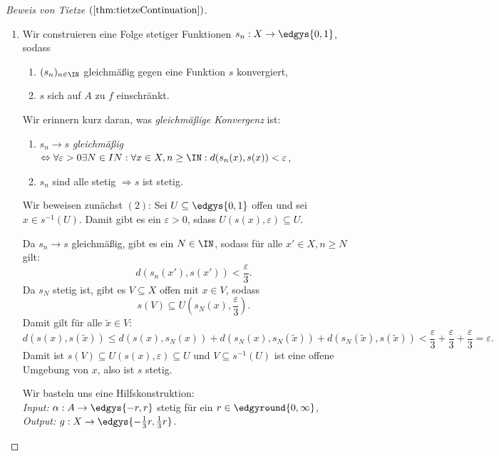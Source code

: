 \documentclass[language=ngerman]{TemplateLecture} %
\begin{document}
\begin{proof}[Beweis von Tietze $(\ref{thm:tietzeContinuation})$]\leavevmode
    \begin{enumerate}[$(i)$]
        \item Wir construieren eine Folge stetiger Funktionen $s_n: X \to \edgys{0,1}$, sodass
        \begin{enumerate}[$(a)$]
            \item $(s_n)_{n \in \IN}$ gleichmäßig gegen eine Funktion $s$ konvergiert,
            \item $s$ sich auf $A$ zu $f$ einschränkt.
        \end{enumerate}
        Wir erinnern kurz daran, was \emph{gleichmäßige Konvergenz} ist:
        \begin{enumerate}[$(1)$]
            \item $s_n \to s$ \emph{gleichmäßig} $\Leftrightarrow \forall \varepsilon>0 \exists N \in IN: \forall x \in X, n \geq \IN: d(s_n(x), s(x)) < \varepsilon$,
            \item $s_n$ sind alle stetig $\Rightarrow s$ ist stetig.
        \end{enumerate}
        Wir beweisen zunächst $(2)$: Sei $U \subseteq \edgys{0,1}$ offen und sei $x \in s^{-1}(U)$. Damit gibt es ein $\varepsilon > 0$, sdass $U(s(x), \varepsilon) \subseteq U$.

        Da $s_n \to s$ gleichmäßig, gibt es ein $N \in \IN$, sodass für alle $x' \in X, n \geq N$ gilt:
        \begin{equation*}
            d(s_n(x'), s(x')) < \frac{\varepsilon}{3}.
        \end{equation*}
        Da $s_N$ stetig ist, gibt es $V \subseteq X$ offen mit $x \in V$, sodass 
        \begin{equation*}
            s(V) \subseteq U\left(s_N(x), \frac{\varepsilon}{3}\right).
        \end{equation*}
        Damit gilt für alle $\tilde{x} \in V$:
        \begin{equation*}
            d(s(x), s(\tilde{x})) \leq d(s(x), s_N(x)) + d(s_N(x), s_N(\tilde{x})) + d(s_N(\tilde{x}), s(\tilde{x})) < \frac{\varepsilon}{3} + \frac{\varepsilon}{3} + \frac{\varepsilon}{3} = \varepsilon.
        \end{equation*}
        Damit ist $s(V) \subseteq U(s(x), \varepsilon) \subseteq U$ und $V \subseteq s^{-1}(U)$ ist eine offene Umgebung von $x$, also ist $s$ stetig.

        Wir basteln uns eine Hilfskonstruktion: \\
        \emph{Input:} $\alpha: A \to \edgys{-r, r}$ stetig für ein $r \in \edgyround{0,\infty}$,\\
        \emph{Output:} $g: X \to \edgys{-\frac{1}{3} r, \frac{1}{3} r}$.


\end{enumerate}
\end{proof}
\end{document}
